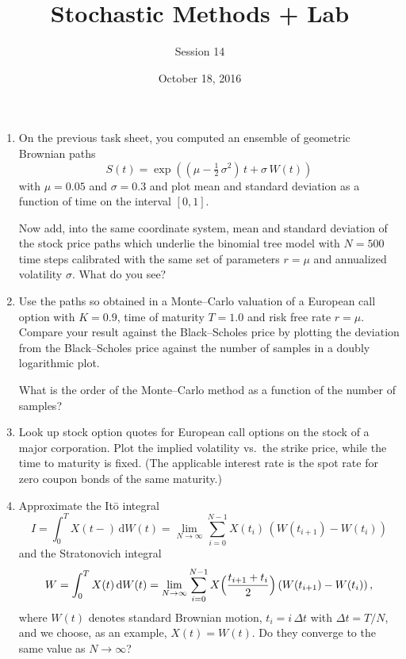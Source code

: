 \documentclass[12pt]{article}
\def\d{\mathrm d}
\begin{document}
\title{Stochastic Methods + Lab}
\author{Session 14}
\date{October 18, 2016}
\maketitle

\begin{enumerate}


\item On the previous task sheet, you computed an ensemble of
geometric Brownian paths
\[
  S(t) = \exp((\mu - \tfrac12 \, \sigma^2)\, t + \sigma \, W(t))
\]
with $\mu=0.05$ and $\sigma=0.3$ and plot mean and standard deviation as
a function of time on the interval $[0,1]$.

Now add, into the same coordinate system, mean and standard deviation
of the stock price paths which underlie the binomial tree model with
$N=500$ time steps calibrated with the same set of parameters $r=\mu$
and annualized volatility $\sigma$.  What do you see?

\item Use the paths so obtained in a Monte--Carlo valuation of a
European call option with $K=0.9$, time of maturity $T=1.0$ and risk
free rate $r=\mu$.  Compare your result against the Black--Scholes
price by plotting the deviation from the Black--Scholes price against
the number of samples in a doubly logarithmic plot.

What is the order of the Monte--Carlo method as a function of the
number of samples?

\item Look up stock option quotes for European call options on the
stock of a major corporation.  Plot the implied volatility vs.\ the
strike price, while the time to maturity is fixed.  (The applicable
interest rate is the spot rate for zero coupon bonds of the same
maturity.)

\item Approximate the It\=o integral
\[
  I = \int_0^T X(t-) \, \d W(t)
    = \lim_{N\to\infty} \sum_{i=0}^{N-1} X(t_i) \, (W(t_{i+1}) -
    W(t_i))
\]
and the Stratonovich integral
\[
  W = \int_0^T X(t) \, \d W(t)
    = \lim_{N\to\infty} 
      \sum_{i=0}^{N-1} X\Bigl(\frac{t_{i+1}+t_i}2 \Bigr) 
      \, (W(t_{i+1}) - W(t_i)) \,,
\]
where $W(t)$ denotes standard Brownian motion, $t_i = i \, \Delta t$
with $\Delta t = T/N$, and we choose, as an example, $X(t)=W(t)$.   Do
they converge to the same value as $N \to \infty$?

\end{enumerate}
\end{document}
